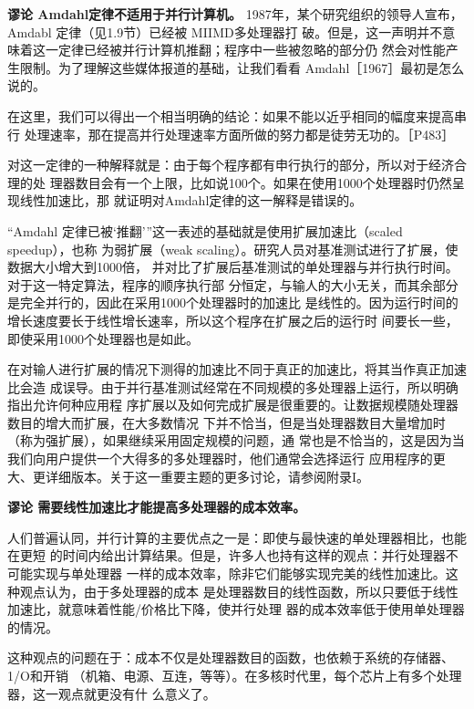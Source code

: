\textbf{谬论 Amdahl定律不适用于并行计算机。}
1987年，某个研究组织的领导人宣布，Amdabl 定律（见1.9节）已经被 MIIMD多处理器打
破。但是，这一声明并不意味着这一定律已经被并行计算机推翻；程序中一些被忽略的部分仍
然会对性能产生限制。为了理解这些媒体报道的基础，让我们看看 Amdahl［1967］最初是怎么
说的。

\begin{tcolorbox}
    在这里，我们可以得出一个相当明确的结论：如果不能以近乎相同的幅度来提高串行
    处理速率，那在提高并行处理速率方面所做的努力都是徒劳无功的。［P483］
\end{tcolorbox}

对这一定律的一种解释就是：由于每个程序都有申行执行的部分，所以对于经济合理的处
理器数目会有一个上限，比如说100个。如果在使用1000个处理器时仍然呈现线性加速比，那
就证明对Amdahl定律的这一解释是错误的。

“Amdahl 定律已被‘推翻’”这一表述的基础就是使用扩展加速比（scaled speedup），也称
为弱扩展（weak scaling）。研究人员对基准测试进行了扩展，使数据大小增大到1000倍，
并对比了扩展后基准测试的单处理器与并行执行时间。对于这一特定算法，程序的顺序执行部
分恒定，与输人的大小无关，而其余部分是完全并行的，因此在采用1000个处理器时的加速比
是线性的。因为运行时间的增长速度要长于线性增长速率，所以这个程序在扩展之后的运行时
间要长一些，即使采用1000个处理器也是如此。

在对输人进行扩展的情况下测得的加速比不同于真正的加速比，将其当作真正加速比会造
成误导。由于并行基准测试经常在不同规模的多处理器上运行，所以明确指出允许何种应用程
序扩展以及如何完成扩展是很重要的。让数据规模随处理器数目的增大而扩展，在大多数情况
下并不恰当，但是当处理器数目大量增加时（称为强扩展），如果继续采用固定规模的问题，通
常也是不恰当的，这是因为当我们向用户提供一个大得多的多处理器时，他们通常会选择运行
应用程序的更大、更详细版本。关于这一重要主题的更多讨论，请参阅附录I。

\textbf{谬论 需要线性加速比才能提高多处理器的成本效率。}

人们普遍认同，并行计算的主要优点之一是：即使与最快速的单处理器相比，也能在更短
的时间内给出计算结果。但是，许多人也持有这样的观点：并行处理器不可能实现与单处理器
一样的成本效率，除非它们能够实现完美的线性加速比。这种观点认为，由于多处理器的成本
是处理器数目的线性函数，所以只要低于线性加速比，就意味着性能/价格比下降，使并行处理
器的成本效率低于使用单处理器的情况。

这种观点的问题在于：成本不仅是处理器数目的函数，也依赖于系统的存储器、1/O和开销
（机箱、电源、互连，等等）。在多核时代里，每个芯片上有多个处理器，这一观点就更没有什
么意义了。

